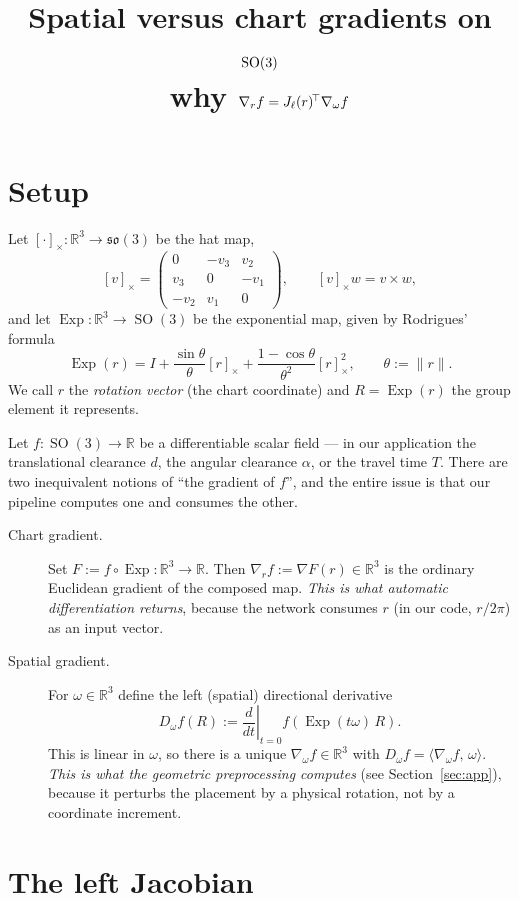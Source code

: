 \documentclass[11pt]{article}
\title{Spatial versus chart gradients on $\SO(3)$\\
{\large why $\nabla_r f = J_{\ell}(r)^{\!\top}\nabla_\omega f$}}
\author{}
\date{}
\theoremstyle{definition}
\DeclareMathOperator{\SO}{SO}
\DeclareMathOperator{\Exp}{Exp}
\newcommand{\so}{\mathfrak{so}}
\newcommand{\R}{\mathbb{R}}
\newcommand{\ip}[2]{\langle #1,\, #2 \rangle}
\newcommand{\skewm}[1]{[#1]_{\times}}
\begin{document}
\maketitle

\section{Setup}

Let $\skewm{\cdot}:\R^3\to\so(3)$ be the hat map,
\[
  \skewm{v} =
  \begin{pmatrix}
    0 & -v_3 & v_2\\
    v_3 & 0 & -v_1\\
    -v_2 & v_1 & 0
  \end{pmatrix},
  \qquad \skewm{v}w = v\times w,
\]
and let $\Exp:\R^3\to\SO(3)$ be the exponential map, given by Rodrigues' formula
\[
  \Exp(r) = I + \frac{\sin\theta}{\theta}\skewm{r}
          + \frac{1-\cos\theta}{\theta^{2}}\skewm{r}^{2},
  \qquad \theta := \lVert r\rVert .
\]
We call $r$ the \emph{rotation vector} (the chart coordinate) and $R=\Exp(r)$ the
group element it represents.

Let $f:\SO(3)\to\R$ be a differentiable scalar field --- in our application the
translational clearance $d$, the angular clearance $\alpha$, or the travel time
$T$. There are two inequivalent notions of ``the gradient of $f$'', and the
entire issue is that our pipeline computes one and consumes the other.

\begin{description}
\item[Chart gradient.] Set $F := f\circ\Exp:\R^3\to\R$. Then
  $\nabla_r f := \nabla F(r)\in\R^3$ is the ordinary Euclidean gradient of the
  composed map. \emph{This is what automatic differentiation returns}, because
  the network consumes $r$ (in our code, $r/2\pi$) as an input vector.

\item[Spatial gradient.] For $\omega\in\R^3$ define the left (spatial)
  directional derivative
  \[
    D_\omega f(R) := \left.\frac{d}{dt}\right|_{t=0} f\!\left(\Exp(t\omega)\,R\right).
  \]
  This is linear in $\omega$, so there is a unique $\nabla_\omega f\in\R^3$ with
  $D_\omega f = \ip{\nabla_\omega f}{\omega}$. \emph{This is what the geometric
  preprocessing computes} (see Section~\ref{sec:app}), because it perturbs the
  placement by a physical rotation, not by a coordinate increment.
\end{description}

\section{The left Jacobian}
\end{document}
